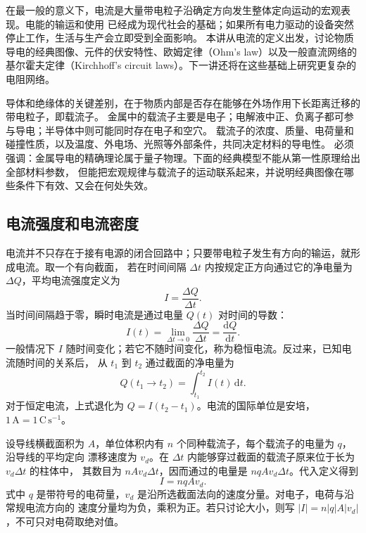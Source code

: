 在最一般的意义下，电流是大量带电粒子沿确定方向发生整体定向运动的宏观表现。电能的输运和使用
已经成为现代社会的基础；如果所有电力驱动的设备突然停止工作，生活与生产会立即受到全面影响。
本讲从电流的定义出发，讨论物质导电的经典图像、元件的伏安特性、欧姆定律（Ohm's law）以及一般直流网络的
基尔霍夫定律（Kirchhoff's circuit laws）。下一讲还将在这些基础上研究更复杂的电阻网络。

导体和绝缘体的关键差别，在于物质内部是否存在能够在外场作用下长距离迁移的带电粒子，即载流子。
金属中的载流子主要是电子；电解液中正、负离子都可参与导电；半导体中则可能同时存在电子和空穴。
载流子的浓度、质量、电荷量和碰撞性质，以及温度、外电场、光照等外部条件，共同决定材料的导电性。
必须强调：金属导电的精确理论属于量子物理。下面的经典模型不能从第一性原理给出全部材料参数，
但能把宏观规律与载流子的运动联系起来，并说明经典图像在哪些条件下有效、又会在何处失效。

\subsection*{电流强度和电流密度}

电流并不只存在于接有电源的闭合回路中；只要带电粒子发生有方向的输运，就形成电流。取一个有向截面，
若在时间间隔 $\Delta t$ 内按规定正方向通过它的净电量为 $\Delta Q$，平均电流强度定义为
\begin{equation}
  \boxed{I=\frac{\Delta Q}{\Delta t}}.
\end{equation}
当时间间隔趋于零，瞬时电流是通过电量 $Q(t)$ 对时间的导数：
\begin{equation}
  \boxed{I(t)=\lim_{\Delta t\to0}\frac{\Delta Q}{\Delta t}
  =\frac{\mathrm dQ}{\mathrm dt}}.
\end{equation}
一般情况下 $I$ 随时间变化；若它不随时间变化，称为稳恒电流。反过来，已知电流随时间的关系后，
从 $t_1$ 到 $t_2$ 通过截面的净电量为
\begin{equation}
  \boxed{Q(t_1\to t_2)=\int_{t_1}^{t_2}I(t)\,\mathrm dt}.
\end{equation}
对于恒定电流，上式退化为 $Q=I(t_2-t_1)$。电流的国际单位是安培，
$1\,\mathrm A=1\,\mathrm C\,\mathrm s^{-1}$。

设导线横截面积为 $A$，单位体积内有 $n$ 个同种载流子，每个载流子的电量为 $q$，沿导线的平均定向
漂移速度为 $v_d$。在 $\Delta t$ 内能够穿过截面的载流子原来位于长为 $v_d\Delta t$ 的柱体中，
其数目为 $nAv_d\Delta t$，因而通过的电量是 $nqAv_d\Delta t$。代入定义得到
\begin{equation}
  \boxed{I=nqAv_d}.
\end{equation}
式中 $q$ 是带符号的电荷量，$v_d$ 是沿所选截面法向的速度分量。对电子，电荷与沿常规电流方向的
速度分量均为负，乘积为正。若只讨论大小，则写 $|I|=n|q|A|v_d|$，不可只对电荷取绝对值。

